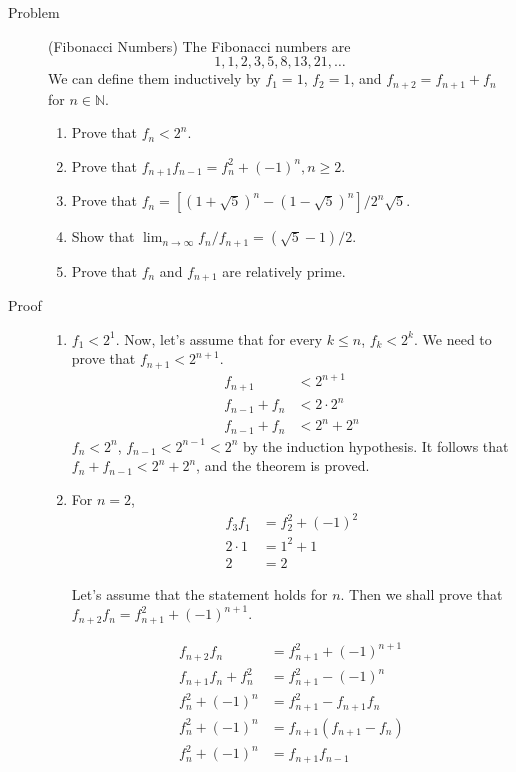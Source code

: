 \begin{description}
\item[Problem] (Fibonacci Numbers) The Fibonacci numbers are
$$1, 1, 2, 3, 5, 8, 13, 21, \dots$$
We can define them inductively by $f_1 = 1$, $f_2 = 1$, and $f_{n+2} = f_{n+1}
+ f_n$ for $n \in \mathbb{N}$.
\begin{enumerate}
\item Prove that $f_n < 2^n$.
\item Prove that $f_{n+1} f_{n-1} = f_n^2 + (-1)^n, n \ge 2$.
\item Prove that $f_n = \left[(1 + \sqrt 5)^n - (1 - \sqrt 5)^n\right]/2^n
\sqrt 5$.
\item Show that $\lim_{n\to\infty} f_n / f_{n+1} = (\sqrt 5 - 1) / 2$.
\item Prove that $f_n$ and $f_{n+1}$ are relatively prime.
\end{enumerate}

\item[Proof]
\begin{enumerate}
\item $f_1 < 2^1$. Now, let's assume that for every $k \le n$, $f_k < 2^k$.
We need to prove that $f_{n+1} < 2^{n+1}$.
\begin{align*}
f_{n+1} &< 2^{n+1} \\
f_{n-1} + f_n &< 2 \cdot 2^n \\
f_{n-1} + f_n &< 2^n + 2^n
\end{align*}
$f_n < 2^n$, $f_{n-1} < 2^{n-1} < 2^n$ by the induction hypothesis. It follows
that $f_n + f_{n-1} < 2^n + 2^n$, and the theorem is proved.

\item For $n = 2$,
\begin{align*}
f_3 f_1 &= f_2^2 + (-1)^2 \\
2 \cdot 1 &= 1^2 + 1 \\
2 &= 2
\end{align*}

Let's assume that the statement holds for $n$. Then we shall prove that
$f_{n+2} f_n = f_{n+1}^2 + (-1)^{n+1}$.

\begin{align*}
f_{n+2} f_n &= f_{n+1}^2 + (-1)^{n+1} \\
f_{n+1} f_n + f_n^2 &= f_{n+1}^2 - (-1)^n \\
f_n^2 + (-1)^n &= f_{n+1}^2 - f_{n+1} f_n \\
f_n^2 + (-1)^n &= f_{n+1} (f_{n+1} - f_n) \\
f_n^2 + (-1)^n &= f_{n+1} f_{n-1}
\end{align*}


\end{enumerate}
\end{description}
